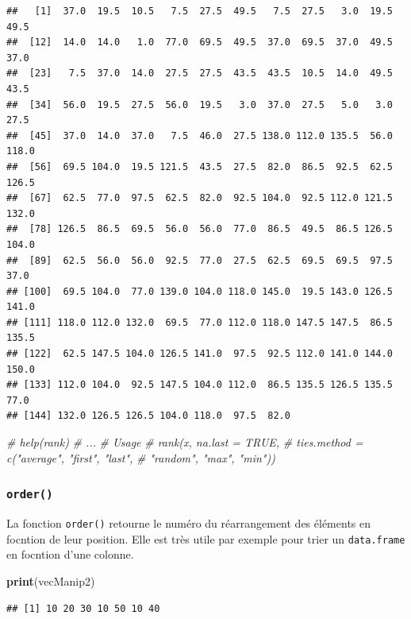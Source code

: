 \documentclass[]{book}
\newenvironment{Shaded}{\begin{snugshade}}{\end{snugshade}}
\newcommand{\CommentTok}[1]{\textcolor[rgb]{0.56,0.35,0.01}{\textit{#1}}}
\newcommand{\KeywordTok}[1]{\textcolor[rgb]{0.13,0.29,0.53}{\textbf{#1}}}
\newcommand{\NormalTok}[1]{#1}
\begin{document}
\begin{verbatim}
##   [1]  37.0  19.5  10.5   7.5  27.5  49.5   7.5  27.5   3.0  19.5  49.5
##  [12]  14.0  14.0   1.0  77.0  69.5  49.5  37.0  69.5  37.0  49.5  37.0
##  [23]   7.5  37.0  14.0  27.5  27.5  43.5  43.5  10.5  14.0  49.5  43.5
##  [34]  56.0  19.5  27.5  56.0  19.5   3.0  37.0  27.5   5.0   3.0  27.5
##  [45]  37.0  14.0  37.0   7.5  46.0  27.5 138.0 112.0 135.5  56.0 118.0
##  [56]  69.5 104.0  19.5 121.5  43.5  27.5  82.0  86.5  92.5  62.5 126.5
##  [67]  62.5  77.0  97.5  62.5  82.0  92.5 104.0  92.5 112.0 121.5 132.0
##  [78] 126.5  86.5  69.5  56.0  56.0  77.0  86.5  49.5  86.5 126.5 104.0
##  [89]  62.5  56.0  56.0  92.5  77.0  27.5  62.5  69.5  69.5  97.5  37.0
## [100]  69.5 104.0  77.0 139.0 104.0 118.0 145.0  19.5 143.0 126.5 141.0
## [111] 118.0 112.0 132.0  69.5  77.0 112.0 118.0 147.5 147.5  86.5 135.5
## [122]  62.5 147.5 104.0 126.5 141.0  97.5  92.5 112.0 141.0 144.0 150.0
## [133] 112.0 104.0  92.5 147.5 104.0 112.0  86.5 135.5 126.5 135.5  77.0
## [144] 132.0 126.5 126.5 104.0 118.0  97.5  82.0
\end{verbatim}

\begin{Shaded}
\begin{Highlighting}[]
\CommentTok{# help(rank)}
\CommentTok{# ...}
\CommentTok{# Usage}
\CommentTok{# rank(x, na.last = TRUE,}
\CommentTok{#     ties.method = c("average", "first", "last", }
\CommentTok{#       "random", "max", "min"))}
\end{Highlighting}
\end{Shaded}

\hypertarget{l015order}{%
\subsubsection{\texorpdfstring{\texttt{order()}}{order()}}\label{l015order}}

La fonction \texttt{order()} retourne le numéro du réarrangement des éléments en focntion de leur position. Elle est très utile par exemple pour trier un \texttt{data.frame} en focntion d'une colonne.

\begin{Shaded}
\begin{Highlighting}[]
\KeywordTok{print}\NormalTok{(vecManip2)}
\end{Highlighting}
\end{Shaded}

\begin{verbatim}
## [1] 10 20 30 10 50 10 40
\end{verbatim}
\end{document}
